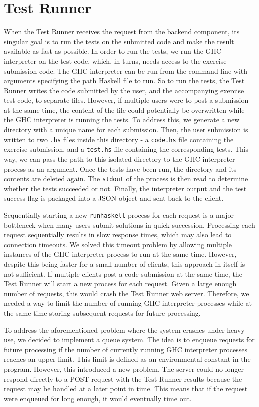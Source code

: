 \chapter{Test Runner} \label{chap:TestRunner}
When the Test Runner receives the request from the backend component, its singular goal is to run the tests on the submitted code and make the result available as fast as possible.
In order to run the tests, we run the GHC interpreter on the test code, which, in turns, needs access to the exercise submission code.
The GHC interpreter can be run from the command line with arguments specifying the path Haskell file to run.
So to run the tests, the Test Runner writes the code submitted by the user, and the accompanying exercise test code, to separate files.
However, if multiple users were to post a submission at the same time, the content of the file could potentially be overwritten while the GHC interpreter is running the tests.
To address this, we generate a new directory with a unique name for each submission.
Then, the user submission is written to two  \texttt{.hs} files inside this directory - a \texttt{code.hs} file containing the exercise submission, and a \texttt{test.hs} file containing the corresponding tests.
This way, we can pass the path to this isolated directory to the GHC interpreter process as an argument.
Once the tests have been run, the directory and its contents are deleted again.
The \texttt{stdout} of the process is then read to determine whether the tests succeeded or not.
Finally, the interpreter output and the test success flag is packaged into a JSON object and sent back to the client.

Sequentially starting a new \texttt{runhaskell} process for each request is a major bottleneck when many users submit solutions in quick succession.
Processing each request sequentially results in slow response times, which may also lead to connection timeouts.
We solved this timeout problem by allowing multiple instances of the GHC interpreter process to run at the same time.
However, despite this being faster for a small number of clients, this approach in itself is not sufficient.
If multiple clients post a code submission at the same time, the Test Runner will start a new process for each request.
Given a large enough number of requests, this would crash the Test Runner web server.
Therefore, we needed a way to limit the number of running GHC interpreter processes while at the same time storing subsequent requests for future processing.

To address the aforementioned problem where the system crashes under heavy use, we decided to implement a queue system.
The idea is to enqueue requests for future processing if the number of currently running GHC interpreter processes reaches an upper limit.
This limit is defined as an environmental constant in the program.
However, this introduced a new problem.
The server could no longer respond directly to a POST request with the Test Runner results because the request may be handled at a later point in time.
This means that if the request were enqueued for long enough, it would eventually time out.



